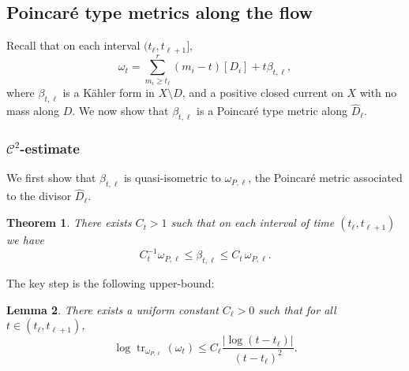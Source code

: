 \documentclass[11pt]{amsart}
\numberwithin{equation}{section}
\newtheorem{theorem}{Theorem}[section]
\newtheorem{lem}[theorem]{Lemma}
\newcommand{\tr}{\operatorname{tr}}
\begin{document}
\subsection{Poincaré type metrics along the flow}

   Recall that on each interval $(t_\ell, t_{\ell+1}]$,
   $$
\omega_t=\sum_{m_i\geq t_\ell}^r (m_i-t) [D_i]+t \beta_{t, \ell},
$$
 where $\beta_{t, \ell}$ is a  K\"ahler form in  $X \setminus D$, and
  a positive closed current on $X$ with no mass along  $D$.
 We now show   that $\beta_{t, \ell}$ is a Poincaré type metric along $\hat{D}_\ell$.
   
  
  
  
  \subsubsection{${\mathcal C}^2$-estimate}
   
   We first show that $\beta_{t, \ell}$ is quasi-isometric to $\omega_{P, \ell}$, 
   the Poincar\'e metric associated to the divisor $\hat{D}_\ell$.
 
 \begin{theorem} \label{thm:c2hyp}
	 There exists $C_t>1$ such that on each interval of time $(t_\ell, t_{\ell+1})$ we have   
	 $$
	 C_t^{-1} \omega_{P,\ell} \leq \beta_{t,\ell} \leq C_t \, \omega_{P, \ell}.
	 $$
\end{theorem}

The key step 
is the following upper-bound:


\begin{lem} \label{lem:c2baby}
There exists a uniform constant $C_{\ell}>0$ such that for all $t\in (t_\ell, t_{\ell+1})$,
\[
\log \tr_{\omega_{P,\ell}} (\omega_{t}) \leq C_{\ell} \frac{|\log (t-t_{\ell})|}{(t-t_{\ell})^2}.
\]
\end{lem}
\end{document}
